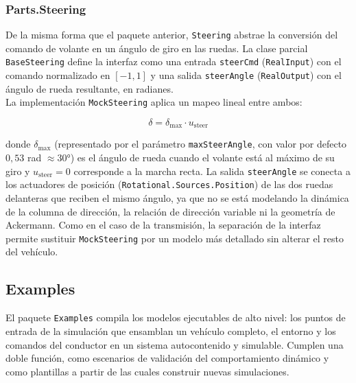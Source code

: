 \subsubsection*{Parts.Steering}

De la misma forma que el paquete anterior, \verb|Steering| abstrae la conversión del comando de volante en un ángulo de giro en las ruedas. La clase parcial \verb|BaseSteering| define la interfaz como una entrada \verb|steerCmd| (\verb|RealInput|) con el comando normalizado en $[-1, 1]$ y una salida \verb|steerAngle| (\verb|RealOutput|) con el ángulo de rueda resultante, en radianes.\\

La implementación \verb|MockSteering| aplica un mapeo lineal entre ambos:

\begin{equation}
    \delta = \delta_\text{max} \cdot u_\text{steer}
\end{equation}

donde $\delta_\text{max}$ (representado por el parámetro \verb|maxSteerAngle|, con valor por defecto $0{,}53$ rad $\approx 30°$) es el ángulo de rueda cuando el volante está al máximo de su giro y $u_\text{steer} = 0$ corresponde a la marcha recta. La salida \verb|steerAngle| se conecta a los actuadores de posición (\verb|Rotational.Sources.Position|) de las dos ruedas delanteras que reciben el mismo ángulo, ya que no se está modelando la dinámica de la columna de dirección, la relación de dirección variable ni la geometría de Ackermann. Como en el caso de la transmisión, la separación de la interfaz permite sustituir \verb|MockSteering| por un modelo más detallado sin alterar el resto del vehículo.\\

\subsection{Examples}

El paquete \verb|Examples| compila los modelos ejecutables de alto nivel: los puntos de entrada de la simulación que ensamblan un vehículo completo, el entorno y los comandos del conductor en un sistema autocontenido y simulable. Cumplen una doble función, como escenarios de validación del comportamiento dinámico y como plantillas a partir de las cuales construir nuevas simulaciones.\\


